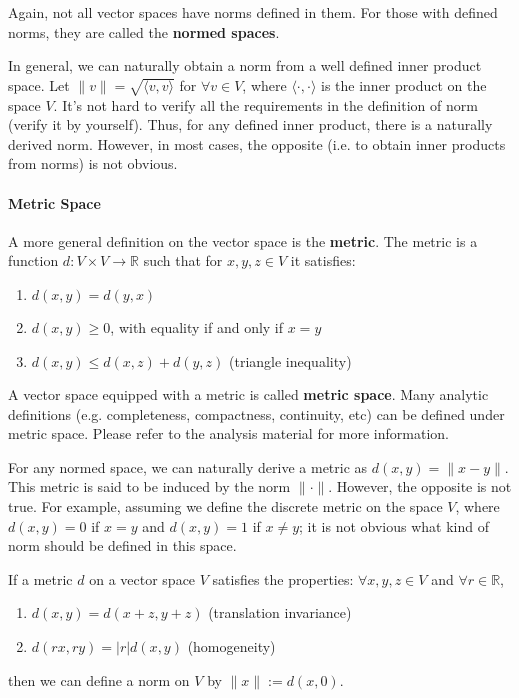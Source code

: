 \documentclass[12pt,oneside]{article}
\begin{document}
Again, not all vector spaces have norms defined in them.  For those with defined norms, they are called the \textbf{normed spaces}.

In general, we can naturally obtain a norm from a well defined inner product space. Let $\|v\|=\sqrt{\langle v,v \rangle}$ for $\forall v\in V$, where $\langle \cdot,\cdot \rangle$ is the inner product on the space $V$. It's not hard to verify all the requirements in the definition of norm (verify it by yourself). Thus, for any defined inner product, there is a naturally derived norm. However, in most cases, the opposite (i.e. to obtain inner products from norms) is not obvious.

\paragraph{Metric Space}
A more general definition on the vector space is the \textbf{metric}. 
The metric is a function $d: V \times V\rightarrow \mathbb{R}$ such that for $x,y,z \in V$ it satisfies:
\begin{enumerate}
\item $d(x,y) = d(y,x)$
\item $d(x,y) \geq 0$, with equality if and only if $x=y$
\item $d(x,y)\leq d(x,z)+d(y,z)$ (triangle inequality)
\end{enumerate}
A vector space equipped with a metric is called \textbf{metric space}. Many analytic definitions (e.g. completeness, compactness, continuity, etc) can be defined under metric space.
Please refer to the analysis material for more information.

For any normed space, we can naturally derive a metric as $d(x,y)=\|x-y\|$. This metric is said to be induced by the norm $\|\cdot\|$. However, the opposite is not true. For example, assuming we define the discrete metric on the space $V$, where $d(x,y)=0$ if $x=y$ and $d(x,y)=1$ if $x\neq y$; it is not obvious what kind of norm should be defined in this space.

If a metric $d$ on a vector space $V$ satisfies the properties:
$\forall x, y, z\in V$ and $\forall r \in \mathbb{R}$,
\begin{enumerate}
\item $d(x,y) = d(x + z, y+z)$ (translation invariance)
\item $d(rx, ry) = |r| d(x, y)$ (homogeneity)
\end{enumerate}
then we can define a norm on $V$ by $\|x\| := d(x,0)$.\\
\end{document}
